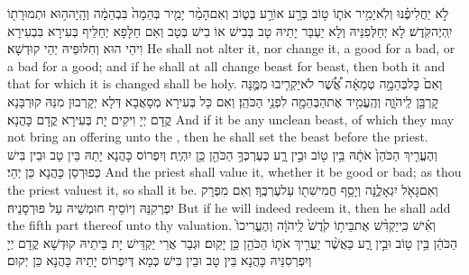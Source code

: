 {לֹ֣א יַחֲלִיפֶ֗נּוּ וְלֹֽא\maqqaf יָמִ֥יר אֹת֛וֹ ט֥וֹב בְּרָ֖ע אוֹ\maqqaf רַ֣ע בְּט֑וֹב וְאִם\maqqaf הָמֵ֨ר יָמִ֤יר בְּהֵמָה֙ בִּבְהֵמָ֔ה וְהָֽיָה\maqqaf ה֥וּא וּתְמוּרָת֖וֹ יִֽהְיֶה\maqqaf קֹּֽדֶשׁ׃}
{לָא יְחַלְּפִנֵּיהּ וְלָא יַעְבַּר יָתֵיהּ טָב בְּבִישׁ אוֹ בִישׁ בְּטָב וְאִם חַלָּפָא יְחַלֵּיף בְּעִירָא בִּבְעִירָא וִיהֵי הוּא וְחִלּוּפֵיהּ יְהֵי קוּדְשָׁא׃}
{He shall not alter it, nor change it, a good for a bad, or a bad for a good; and if he shall at all change beast for beast, then both it and that for which it is changed shall be holy.}{}
{וְאִם֙ כׇּל\maqqaf בְּהֵמָ֣ה טְמֵאָ֔ה אֲ֠שֶׁ֠ר לֹא\maqqaf יַקְרִ֧יבוּ מִמֶּ֛נָּה קׇרְבָּ֖ן לַֽיהֹוָ֑ה וְהֶֽעֱמִ֥יד אֶת\maqqaf הַבְּהֵמָ֖ה לִפְנֵ֥י הַכֹּהֵֽן׃}
{וְאִם כָּל בְּעִירָא מְסָאֲבָא דְּלָא יְקָרְבוּן מִנַּהּ קוּרְבָּנָא קֳדָם יְיָ וִיקִים יָת בְּעִירָא קֳדָם כָּהֲנָא׃}
{And if it be any unclean beast, of which they may not bring an offering unto the \lord, then he shall set the beast before the priest.}{}
{וְהֶעֱרִ֤יךְ הַכֹּהֵן֙ אֹתָ֔הּ בֵּ֥ין ט֖וֹב וּבֵ֣ין רָ֑ע כְּעֶרְכְּךָ֥ הַכֹּהֵ֖ן כֵּ֥ן יִהְיֶֽה׃}
{וְיִפְרוֹס כָּהֲנָא יָתַהּ בֵּין טָב וּבֵין בִּישׁ כְּפוּרְסַן כָּהֲנָא כֵּן יְהֵי׃}
{And the priest shall value it, whether it be good or bad; as thou the priest valuest it, so shall it be.}{}
{וְאִם\maqqaf גָּאֹ֖ל יִגְאָלֶ֑נָּה וְיָסַ֥ף חֲמִישִׁת֖וֹ עַל\maqqaf עֶרְכֶּֽךָ׃}
{וְאִם מִפְרָק יִפְרְקִנַּהּ וְיוֹסֵיף חוּמְשֵׁיהּ עַל פּוּרְסָנֵיהּ׃}
{But if he will indeed redeem it, then he shall add the fifth part thereof unto thy valuation.}{}
{וְאִ֗ישׁ כִּֽי\maqqaf יַקְדִּ֨שׁ אֶת\maqqaf בֵּית֥וֹ קֹ֙דֶשׁ֙ לַֽיהֹוָ֔ה וְהֶעֱרִיכוֹ֙ הַכֹּהֵ֔ן בֵּ֥ין ט֖וֹב וּבֵ֣ין רָ֑ע כַּאֲשֶׁ֨ר יַעֲרִ֥יךְ אֹת֛וֹ הַכֹּהֵ֖ן כֵּ֥ן יָקֽוּם׃}
{וּגְבַר אֲרֵי יַקְדֵּישׁ יָת בֵּיתֵיהּ קוּדְשָׁא קֳדָם יְיָ וְיִפְרְסִנֵּיהּ כָּהֲנָא בֵּין טָב וּבֵין בִּישׁ כְּמָא דְּיִפְרוֹס יָתֵיהּ כָּהֲנָא כֵּן יְקוּם׃}
